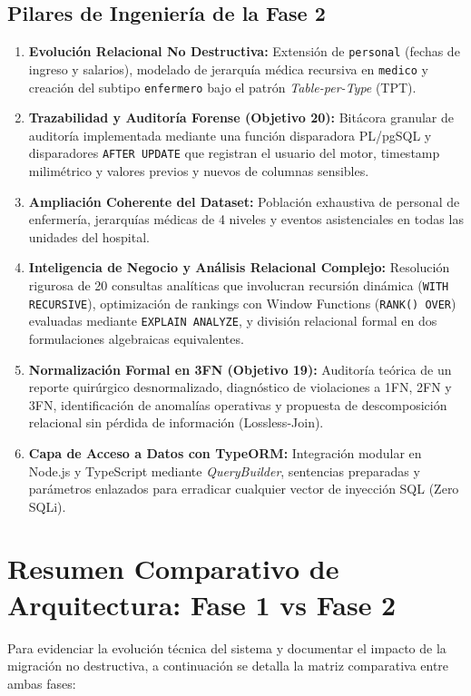 \documentclass[11pt,a4paper]{article}
\begin{document}
\subsection{Pilares de Ingeniería de la Fase 2}
\begin{enumerate}
	\item \textbf{Evolución Relacional No Destructiva:} Extensión de \texttt{personal} (fechas de ingreso y salarios), modelado de jerarquía médica recursiva en \texttt{medico} y creación del subtipo \texttt{enfermero} bajo el patrón \textit{Table-per-Type} (TPT).
	\item \textbf{Trazabilidad y Auditoría Forense (Objetivo 20):} Bitácora granular de auditoría implementada mediante una función disparadora PL/pgSQL y disparadores \texttt{AFTER UPDATE} que registran el usuario del motor, timestamp milimétrico y valores previos y nuevos de columnas sensibles.
	\item \textbf{Ampliación Coherente del Dataset:} Población exhaustiva de personal de enfermería, jerarquías médicas de 4 niveles y eventos asistenciales en todas las unidades del hospital.
	\item \textbf{Inteligencia de Negocio y Análisis Relacional Complejo:} Resolución rigurosa de 20 consultas analíticas que involucran recursión dinámica (\texttt{WITH RECURSIVE}), optimización de rankings con Window Functions (\texttt{RANK() OVER}) evaluadas mediante \texttt{EXPLAIN ANALYZE}, y división relacional formal en dos formulaciones algebraicas equivalentes.
	\item \textbf{Normalización Formal en 3FN (Objetivo 19):} Auditoría teórica de un reporte quirúrgico desnormalizado, diagnóstico de violaciones a 1FN, 2FN y 3FN, identificación de anomalías operativas y propuesta de descomposición relacional sin pérdida de información (Lossless-Join).
	\item \textbf{Capa de Acceso a Datos con TypeORM:} Integración modular en Node.js y TypeScript mediante \textit{QueryBuilder}, sentencias preparadas y parámetros enlazados para erradicar cualquier vector de inyección SQL (Zero SQLi).
\end{enumerate}

\newpage

\section{Resumen Comparativo de Arquitectura: Fase 1 vs Fase 2}
Para evidenciar la evolución técnica del sistema y documentar el impacto de la migración no destructiva, a continuación se detalla la matriz comparativa entre ambas fases:
\end{document}
